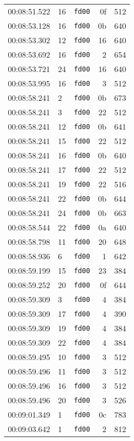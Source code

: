 \documentclass{article}
\begin{document}
\begin{longtable}{lllrr}
00:08:51.522 & 16 & \texttt{fd00} & 0f & 512 \\
00:08:53.128 & 16 & \texttt{fd00} & 0b & 640 \\
00:08:53.302 & 12 & \texttt{fd00} & 16 & 640 \\
00:08:53.692 & 16 & \texttt{fd00} & 2 & 654 \\
00:08:53.721 & 24 & \texttt{fd00} & 16 & 640 \\
00:08:53.995 & 16 & \texttt{fd00} & 3 & 512 \\
00:08:58.241 & 2 & \texttt{fd00} & 0b & 673 \\
00:08:58.241 & 3 & \texttt{fd00} & 22 & 512 \\
00:08:58.241 & 12 & \texttt{fd00} & 0b & 641 \\
00:08:58.241 & 15 & \texttt{fd00} & 22 & 512 \\
00:08:58.241 & 16 & \texttt{fd00} & 0b & 640 \\
00:08:58.241 & 17 & \texttt{fd00} & 22 & 512 \\
00:08:58.241 & 19 & \texttt{fd00} & 22 & 516 \\
00:08:58.241 & 22 & \texttt{fd00} & 0b & 644 \\
00:08:58.241 & 24 & \texttt{fd00} & 0b & 663 \\
00:08:58.544 & 22 & \texttt{fd00} & 0a & 640 \\
00:08:58.798 & 11 & \texttt{fd00} & 20 & 648 \\
00:08:58.936 & 6 & \texttt{fd00} & 1 & 642 \\
00:08:59.199 & 15 & \texttt{fd00} & 23 & 384 \\
00:08:59.252 & 20 & \texttt{fd00} & 0f & 644 \\
00:08:59.309 & 3 & \texttt{fd00} & 4 & 384 \\
00:08:59.309 & 17 & \texttt{fd00} & 4 & 390 \\
00:08:59.309 & 19 & \texttt{fd00} & 4 & 384 \\
00:08:59.309 & 22 & \texttt{fd00} & 4 & 384 \\
00:08:59.495 & 10 & \texttt{fd00} & 3 & 512 \\
00:08:59.496 & 11 & \texttt{fd00} & 3 & 512 \\
00:08:59.496 & 16 & \texttt{fd00} & 3 & 512 \\
00:08:59.496 & 20 & \texttt{fd00} & 3 & 526 \\
00:09:01.349 & 1 & \texttt{fd00} & 0c & 783 \\
00:09:03.642 & 1 & \texttt{fd00} & 2 & 812 \\

\end{longtable}
\end{document}

